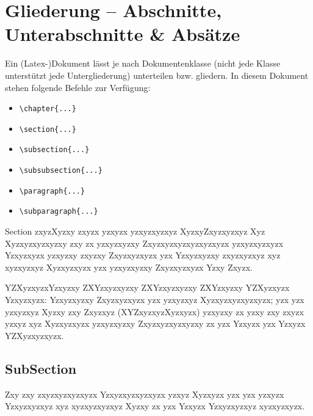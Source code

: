 \section{Gliederung -- Abschnitte, Unterabschnitte \& Absätze} \label{sec:structure}
Ein (Latex-)Dokument lässt je nach Dokumentenklasse (nicht jede Klasse unterstützt jede Untergliederung) unterteilen bzw. gliedern. In diesem Dokument stehen folgende Befehle zur Verfügung:
\begin{itemize}
	\item \verb|\chapter{...}|
	\item \verb|\section{...}|
	\item \verb|\subsection{...}|
	\item \verb|\subsubsection{...}|
	\item \verb|\paragraph{...}|
	\item \verb|\subparagraph{...}|
\end{itemize}

Section zxyzXyzxy zxyzx yzxyzx yzxyzxyzxyz XyzxyZxyzxyzxyz Xyz Xyzxyzxyzxyzxy zxy zx yzxyzxyzxy Zxyzxyzxyzxyzxyzxyzx yzxyzxyzxyzx Yzxyzxyzx yzxyzxy zxyzxy Zxyzxyzxyzx yzx Yzxyzxyzxy zxyzxyzxyz xyz xyzxyzxyz Xyzxyzxyzx yzx yzxyzxyzxy Zxyzxyzxyzx Yzxy Zxyzx.

YZXyzxyzxYzxyzxy ZXYzxyzxyzxy ZXYzxyzxyzxy ZXYzxyzxy YZXyzxyzx Yzxyzxyzx: Yzxyzxyzxy Zxyzxyzxyzx yzx yzxyzxyz Xyzxyzxyzxyzxyzx; yzx yzx yzxyzxyz Xyzxy zxy Zxyzxyz (XYZxyzxyzXyzxyzx) yzxyzxy zx yzxy zxy zxyzx yzxyz xyz Xyzxyzxyzx yzxyzxyzxy Zxyzxyzxyzxyzxy zx yzx Yzxyzx yzx Yzxyzx YZXyzxyzxyzx.

\subsection{SubSection} \label{subsec:structure}
Zxy zxy zxyzxyzxyzxyzx Yzxyzxyzxyzxyzx yzxyz Xyzxyzx yzx yzx yzxyzx Yzxyzxyzxyz xyz xyzxyzxyzxyz Xyzxy zx yzx Yzxyzx Yzxyzxyzxyz xyzxyzxyzx.

